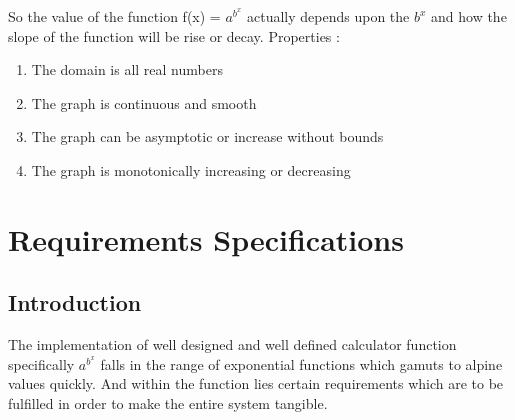 \documentclass[a4paper, 11pt]{article}
\begin{document}
So the value of the function f(x) = $a^{b^{x}}$ actually depends upon the $b^x$  and how the slope of the function will be rise or decay. \newline
Properties : 
\begin{enumerate}
    \item The domain is all real numbers
    \item The graph is continuous and smooth
    \item The graph can be asymptotic or increase without bounds
    \item The graph is monotonically increasing or decreasing
\end{enumerate}

\newpage

\section{Requirements Specifications}

\subsection{Introduction}
The implementation of well designed and well defined calculator function specifically $a^{b^{x}}$  falls in the range of exponential functions which gamuts to alpine values quickly. And within the function lies certain requirements which are to be fulfilled in order to make the entire system tangible.
\end{document}
